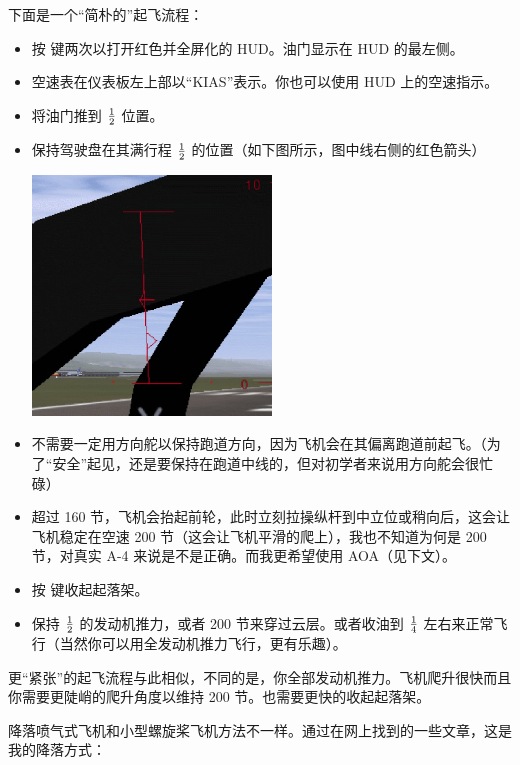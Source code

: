下面是一个“简朴的”起飞流程：
\begin{itemize}
    \item 按  键两次以打开红色并全屏化的 HUD。油门显示在 HUD 的最左侧。
    \item 空速表在仪表板左上部以“KIAS”表示。你也可以使用 HUD 上的空速指示。
    \item 将油门推到 $1\over2$ 位置。
    \item 保持驾驶盘在其满行程 $1\over2$ 的位置（如下图所示，图中线右侧的红色箭头）

\begin{center}
\includegraphics[width=0.5\textwidth]{img/tut_53}
\end{center}

   \item 不需要一定用方向舵以保持跑道方向，因为飞机会在其偏离跑道前起飞。（为了“安全”起见，还是要保持在跑道中线的，但对初学者来说用方向舵会很忙碌）
   \item 超过 160 节，飞机会抬起前轮，此时立刻拉操纵杆到中立位或稍向后，这会让飞机稳定在空速 200 节（这会让飞机平滑的爬上），我也不知道为何是 200 节，对真实 A-4 来说是不是正确。而我更希望使用 AOA（见下文）。
   \item 按  键收起起落架。
   \item 保持 $1\over2$ 的发动机推力，或者 200 节来穿过云层。或者收油到 $1\over4$ 左右来正常飞行（当然你可以用全发动机推力飞行，更有乐趣）。
\end{itemize}

更“紧张”的起飞流程与此相似，不同的是，你全部发动机推力。飞机爬升很快而且你需要更陡峭的爬升角度以维持 200 节。也需要更快的收起起落架。

降落喷气式飞机和小型螺旋桨飞机方法不一样。通过在网上找到的一些文章，这是我的降落方式：

